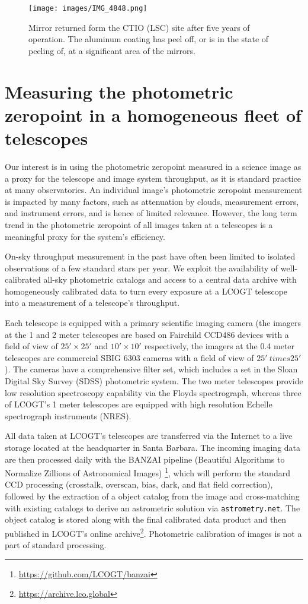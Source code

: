 \documentclass[]{spieman}
\begin{document}
\begin{figure}
\texttt{[image: images/IMG\_4848.png]}
\caption{\label{fig_mirrorpeel} Mirror returned form the CTIO (LSC) site after five years of
operation. The aluminum coating has peel off, or is in the state of peeling of, at a significant
area of the mirrors. }
\end{figure}


\section{Measuring the photometric zeropoint in a homogeneous fleet of telescopes}


Our interest is in using the photometric zeropoint measured in a science image as a proxy for the
telescope and image system throughput, as it is standard practice at many observatories. An individual 
image's photometric zeropoint measurement is impacted by many factors, such as attenuation by clouds, 
measurement errors, and instrument errors, and is hence of limited relevance. However, the long term
trend in the photometric zeropoint of all images taken at a telescopes is a meaningful proxy for the 
system's efficiency.

On-sky throughput measurement in the past have often been limited to isolated observations of a few 
standard stars per year\cite{benn2000}. We exploit the availability of well-calibrated all-sky photometric
catalogs and access to a central data archive with homogeneously calibrated data to turn every exposure 
at a LCOGT telescope into a measurement of a telescope's throughput.  

Each telescope is equipped with a primary scientific imaging camera (the imagers at the 1 and 2
meter telescopes are based on Fairchild CCD486 devices with a field of view of $25' \times 25'$ and
$10' \times 10'$ respectively, the imagers at the 0.4 meter telescopes are commercial SBIG 6303
cameras with a field of view of $25' \ times 25'$). The cameras have a comprehensive filter set,
which includes a set in the Sloan Digital Sky Survey (SDSS) photometric system\cite{fukugita1996}. 
The two meter telescopes provide low resolution spectroscopy capability via the Floyds\cite{brown2013}
spectrograph, whereas three of LCOGT's 1 meter telescopes are equipped with high resolution Echelle 
spectrograph instruments (NRES)\cite{eastman2014,siverd2016}.

All data taken at LCOGT's telescopes are transferred
via the Internet to a live storage located at the headquarter in Santa Barbara. The incoming imaging
data are then processed daily with the BANZAI pipeline (Beautiful Algorithms to Normalize
Zillions of Astronomical Images) \cite{mccully2018}\footnote{\url{https://github.com/LCOGT/banzai}},
which will perform the standard CCD processing (crosstalk, overscan, bias, dark, and flat field
correction), followed by the extraction of a object catalog from the image and cross-matching with
existing catalogs to derive an astrometric solution via {\tt astrometry.net}\cite{lang2010}. The
object catalog is stored along with the final calibrated data product and then published in LCOGT's
online archive\footnote{\url{https://archive.lco.global}}. Photometric calibration of images is not
a part of standard processing.
\end{document}
